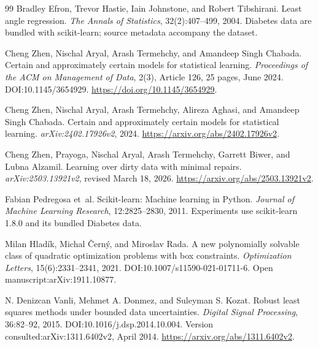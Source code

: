 \begin{thebibliography}{99}
Bradley Efron, Trevor Hastie, Iain Johnstone, and Robert Tibshirani.
\newblock Least angle regression.
\newblock \emph{The Annals of Statistics}, 32(2):407--499, 2004.
\newblock Diabetes data are bundled with scikit-learn; source metadata accompany the dataset.

Cheng Zhen, Nischal Aryal, Arash Termehchy, and Amandeep Singh Chabada.
\newblock Certain and approximately certain models for statistical learning.
\newblock \emph{Proceedings of the ACM on Management of Data}, 2(3), Article 126, 25 pages, June 2024.
\newblock DOI:10.1145/3654929.
\newblock \url{https://doi.org/10.1145/3654929}.

Cheng Zhen, Nischal Aryal, Arash Termehchy, Alireza Aghasi, and Amandeep Singh Chabada.
\newblock Certain and approximately certain models for statistical learning.
\newblock \emph{arXiv:2402.17926v2}, 2024.
\newblock \url{https://arxiv.org/abs/2402.17926v2}.

Cheng Zhen, Prayoga, Nischal Aryal, Arash Termehchy, Garrett Biwer, and Lubna Alzamil.
\newblock Learning over dirty data with minimal repairs.
\newblock \emph{arXiv:2503.13921v2}, revised March 18, 2026.
\newblock \url{https://arxiv.org/abs/2503.13921v2}.

Fabian Pedregosa et~al.
\newblock Scikit-learn: Machine learning in Python.
\newblock \emph{Journal of Machine Learning Research}, 12:2825--2830, 2011.
\newblock Experiments use scikit-learn 1.8.0 and its bundled Diabetes data.

Milan Hlad\'{i}k, Michal \v{C}ern\'{y}, and Miroslav Rada.
\newblock A new polynomially solvable class of quadratic optimization problems with box constraints.
\newblock \emph{Optimization Letters}, 15(6):2331--2341, 2021.
\newblock DOI:10.1007/s11590-021-01711-6. Open manuscript:arXiv:1911.10877.

N. Denizcan Vanli, Mehmet A. Donmez, and Suleyman S. Kozat.
\newblock Robust least squares methods under bounded data uncertainties.
\newblock \emph{Digital Signal Processing}, 36:82--92, 2015.
\newblock DOI:10.1016/j.dsp.2014.10.004. Version consulted:arXiv:1311.6402v2, April 2014.
\newblock \url{https://arxiv.org/abs/1311.6402v2}.


\end{thebibliography}

